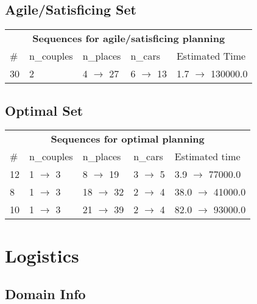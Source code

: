 \documentclass{article}
\begin{document}
                         \subsection*{Agile/Satisficing Set}

                        \begin{center}
                        \begin{tabular}{l|l|l|l|l}
                        \multicolumn{5}{c}{\bf \large Sequences for agile/satisficing planning}\\
                        \# & n\_couples & n\_places & n\_cars & Estimated Time\\\midrule
                        30&2&4 $\rightarrow$ 27&6 $\rightarrow$ 13&1.7 $\rightarrow$ 130000.0
                        \end{tabular}
                        \end{center}
                    
                            \subsection*{Optimal Set}

                            \begin{center}
                            \begin{tabular}{l|l|l|l|l}
                            \multicolumn{5}{c}{\bf \large Sequences for optimal planning}\\
                            \# & n\_couples & n\_places & n\_cars & Estimated time\\\midrule
                            12&1 $\rightarrow$ 3&8 $\rightarrow$ 19&3 $\rightarrow$ 5&3.9 $\rightarrow$ 77000.0\\
8&1 $\rightarrow$ 3&18 $\rightarrow$ 32&2 $\rightarrow$ 4&38.0 $\rightarrow$ 41000.0\\
10&1 $\rightarrow$ 3&21 $\rightarrow$ 39&2 $\rightarrow$ 4&82.0 $\rightarrow$ 93000.0
                            \end{tabular}
                            \end{center}
                    \newpage \section{Logistics}
                    \subsection*{Domain Info}
\end{document}
